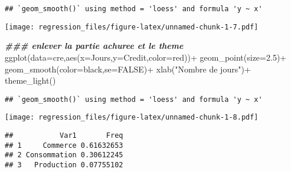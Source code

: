\documentclass[
]{article}
\newenvironment{Shaded}{\begin{snugshade}}{\end{snugshade}}
\newcommand{\AttributeTok}[1]{\textcolor[rgb]{0.77,0.63,0.00}{#1}}
\newcommand{\ConstantTok}[1]{\textcolor[rgb]{0.00,0.00,0.00}{#1}}
\newcommand{\DocumentationTok}[1]{\textcolor[rgb]{0.56,0.35,0.01}{\textbf{\textit{#1}}}}
\newcommand{\FloatTok}[1]{\textcolor[rgb]{0.00,0.00,0.81}{#1}}
\newcommand{\FunctionTok}[1]{\textcolor[rgb]{0.00,0.00,0.00}{#1}}
\newcommand{\NormalTok}[1]{#1}
\newcommand{\OtherTok}[1]{\textcolor[rgb]{0.56,0.35,0.01}{#1}}
\newcommand{\SpecialCharTok}[1]{\textcolor[rgb]{0.00,0.00,0.00}{#1}}
\newcommand{\StringTok}[1]{\textcolor[rgb]{0.31,0.60,0.02}{#1}}
\begin{document}
\begin{verbatim}
## `geom_smooth()` using method = 'loess' and formula 'y ~ x'
\end{verbatim}

\texttt{[image: regression\_files/figure-latex/unnamed-chunk-1-7.pdf]}

\begin{Shaded}
\begin{Highlighting}[]
\DocumentationTok{\#\#\# enlever la partie achuree et le theme}
\FunctionTok{ggplot}\NormalTok{(}\AttributeTok{data=}\NormalTok{cre,}\FunctionTok{aes}\NormalTok{(}\AttributeTok{x=}\NormalTok{Jours,}\AttributeTok{y=}\NormalTok{Credit,}\AttributeTok{color=}\StringTok{\textquotesingle{}red\textquotesingle{}}\NormalTok{))}\SpecialCharTok{+}
  \FunctionTok{geom\_point}\NormalTok{(}\AttributeTok{size=}\FloatTok{2.5}\NormalTok{)}\SpecialCharTok{+}
  \FunctionTok{geom\_smooth}\NormalTok{(}\AttributeTok{color=}\StringTok{\textquotesingle{}black\textquotesingle{}}\NormalTok{,}\AttributeTok{se=}\ConstantTok{FALSE}\NormalTok{)}\SpecialCharTok{+}
  \FunctionTok{xlab}\NormalTok{(}\StringTok{"Nombre de jours"}\NormalTok{)}\SpecialCharTok{+}
  \FunctionTok{theme\_light}\NormalTok{()}
\end{Highlighting}
\end{Shaded}

\begin{verbatim}
## `geom_smooth()` using method = 'loess' and formula 'y ~ x'
\end{verbatim}

\texttt{[image: regression\_files/figure-latex/unnamed-chunk-1-8.pdf]}

\begin{Shaded}
\end{Shaded}

\begin{verbatim}
##           Var1       Freq
## 1     Commerce 0.61632653
## 2 Consommation 0.30612245
## 3   Production 0.07755102
\end{verbatim}
\end{document}
